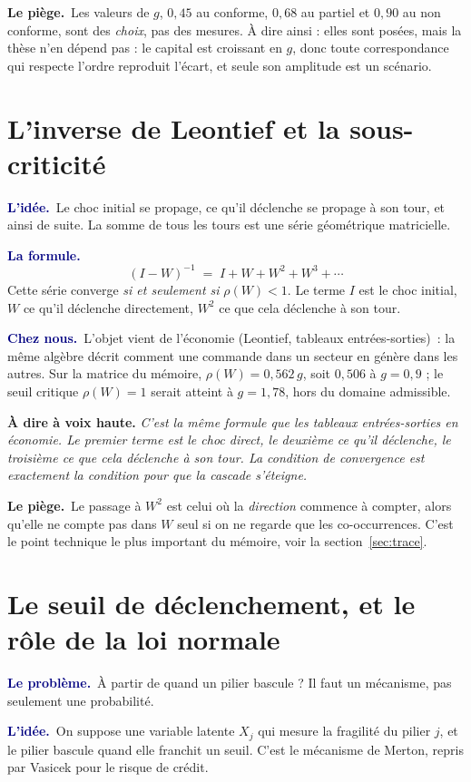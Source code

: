\documentclass[11pt,a4paper]{article}
\newcommand{\lequoi}[1]{\smallskip\noindent\textcolor{navy}{\textbf{Le problème.}}\ #1\par}
\newcommand{\lidee}[1]{\smallskip\noindent\textcolor{navy}{\textbf{L'idée.}}\ #1\par}
\newcommand{\laformule}[1]{\smallskip\noindent\textcolor{navy}{\textbf{La formule.}}\ #1\par}
\newcommand{\cheznous}[1]{\smallskip\noindent\textcolor{navy}{\textbf{Chez nous.}}\ #1\par}
\newcommand{\lepiege}[1]{\smallskip\noindent\textcolor{accent}{\textbf{Le piège.}}\ #1\par}
\newcommand{\laphrase}[1]{\begin{phrasebox}\textbf{À dire à voix haute.} \emph{#1}\end{phrasebox}}
\begin{document}
\lepiege{Les valeurs de $g$, $0{,}45$ au conforme, $0{,}68$ au partiel et $0{,}90$ au non
conforme, sont des \emph{choix}, pas des mesures. À dire ainsi : \og elles sont posées, mais la
thèse n'en dépend pas : le capital est croissant en $g$, donc toute correspondance qui respecte
l'ordre reproduit l'écart, et seule son amplitude est un scénario\fg{}.}

\section{L'inverse de Leontief et la sous-criticité}

\lidee{Le choc initial se propage, ce qu'il déclenche se propage à son tour, et ainsi de
suite. La somme de tous les tours est une série géométrique matricielle.}

\laformule{
\[
  (I-W)^{-1} \;=\; I + W + W^2 + W^3 + \cdots
\]
Cette série converge \emph{si et seulement si} $\rho(W)<1$. Le terme $I$ est le choc
initial, $W$ ce qu'il déclenche directement, $W^2$ ce que cela déclenche à son tour.}

\cheznous{L'objet vient de l'économie (Leontief, tableaux entrées-sorties)~: la même algèbre
décrit comment une commande dans un secteur en génère dans les autres. Sur la matrice du mémoire,
$\rho(W)=0{,}562\,g$, soit $0{,}506$ à $g=0{,}9$ ; le seuil critique $\rho(W)=1$ serait atteint à
$g=1{,}78$, hors du domaine admissible.}

\laphrase{C'est la même formule que les tableaux entrées-sorties en économie. Le premier
terme est le choc direct, le deuxième ce qu'il déclenche, le troisième ce que cela déclenche
à son tour. La condition de convergence est exactement la condition pour que la cascade
s'éteigne.}

\lepiege{Le passage à $W^2$ est celui où la \emph{direction} commence à compter, alors
qu'elle ne compte pas dans $W$ seul si on ne regarde que les co-occurrences. C'est le point
technique le plus important du mémoire, voir la section~\ref{sec:trace}.}

\section{Le seuil de déclenchement, et le rôle de la loi normale}

\lequoi{À partir de quand un pilier bascule ? Il faut un mécanisme, pas seulement une
probabilité.}

\lidee{On suppose une variable latente $X_j$ qui mesure la fragilité du pilier $j$, et le
pilier bascule quand elle franchit un seuil. C'est le mécanisme de Merton, repris par
Vasicek pour le risque de crédit.}
\end{document}
